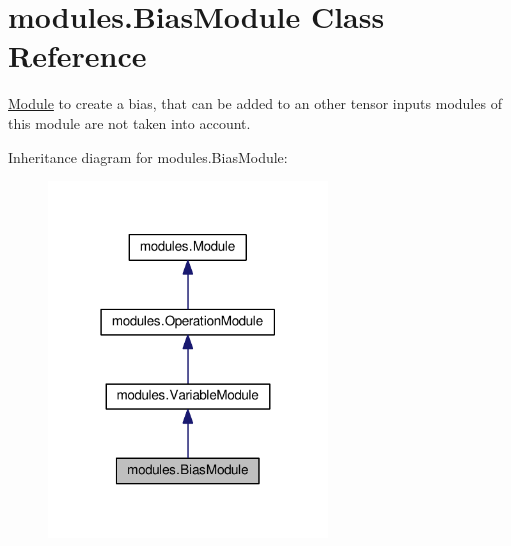 \hypertarget{classmodules_1_1_bias_module}{}\section{modules.\+Bias\+Module Class Reference}
\label{classmodules_1_1_bias_module}


\hyperlink{classmodules_1_1_module}{Module} to create a bias, that can be added to an other tensor inputs modules of this module are not taken into account.  




Inheritance diagram for modules.\+Bias\+Module\+:\nopagebreak
\begin{figure}[H]
\begin{center}
\leavevmode
\includegraphics[width=210pt]{classmodules_1_1_bias_module__inherit__graph}
\end{center}
\end{figure}
